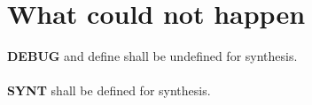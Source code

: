 \section{What could not happen}
\textbf{DEBUG} and define shall be undefined for synthesis.\\
\\
\textbf{SYNT} shall be defined for synthesis.